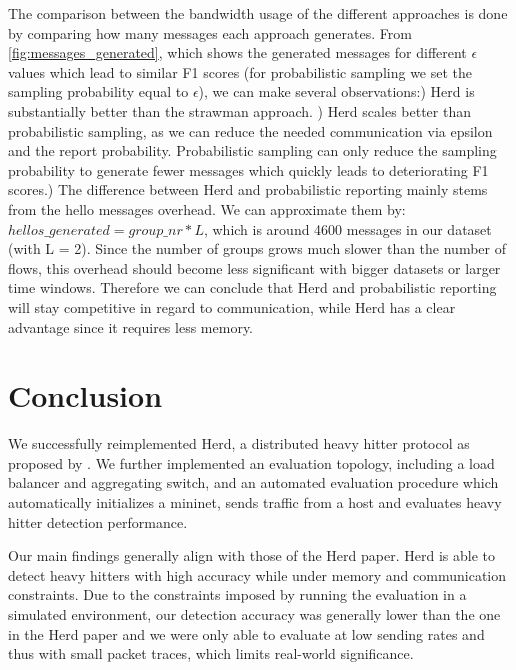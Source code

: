 \documentclass[11pt,oneside,a4paper]{article}
\begin{document}
The comparison between the bandwidth usage of the different approaches is done by comparing how many messages each approach generates. From \ref{fig:messages_generated}, which shows the generated messages for different $\epsilon$ values which lead to similar F1 scores (for probabilistic sampling we set the sampling probability equal to $\epsilon$), we can make several observations:) Herd is substantially better than the strawman approach. ) Herd scales better than probabilistic sampling, as we can reduce the needed communication via epsilon and the report probability. Probabilistic sampling can only reduce the sampling probability to generate fewer messages which quickly leads to deteriorating F1 scores.) The difference between Herd and probabilistic reporting mainly stems from the hello messages overhead. We can approximate them by: $hellos\_generated = group\_nr * L$, which is around 4600 messages in our dataset (with L = 2). Since the number of groups grows much slower than the number of flows, this overhead should become less significant with bigger datasets or larger time windows. Therefore we can conclude that Herd and probabilistic reporting will stay competitive in regard to communication, while Herd has a clear advantage since it requires less memory.

\section{Conclusion}


We successfully reimplemented Herd, a distributed heavy hitter protocol as proposed by \cite{anon2019herd}. We further implemented an evaluation topology, including a load balancer and aggregating switch, and an automated evaluation procedure which automatically initializes a mininet, sends traffic from a host and evaluates heavy hitter detection performance.

\noindent Our main findings generally align with those of the Herd paper. Herd is able to detect heavy hitters with high accuracy while under memory and communication constraints. Due to the constraints imposed by running the evaluation in a simulated environment, our detection accuracy was generally lower than the one in the Herd paper and we were only able to evaluate at low sending rates and thus with small packet traces, which limits  real-world significance.
\end{document}
